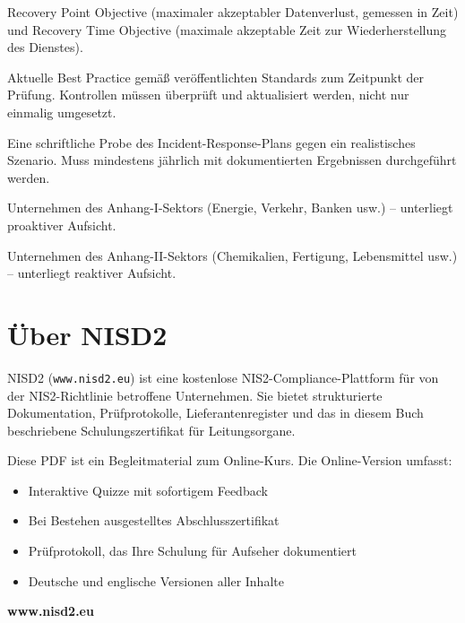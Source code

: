 \documentclass[11pt,a4paper,twoside]{book}
\begin{document}
\begin{description}[style=nextline, leftmargin=0pt, labelindent=0pt, parsep=5pt, itemsep=2pt]
  \item[RPO / RTO] Recovery Point Objective (maximaler akzeptabler Datenverlust, gemessen in Zeit) und Recovery Time Objective (maximale akzeptable Zeit zur Wiederherstellung des Dienstes).

  \item[Stand der Technik] Aktuelle Best Practice gemäß veröffentlichten Standards zum Zeitpunkt der Prüfung. Kontrollen müssen überprüft und aktualisiert werden, nicht nur einmalig umgesetzt.

  \item[Tischübung] Eine schriftliche Probe des Incident-Response-Plans gegen ein realistisches Szenario. Muss mindestens jährlich mit dokumentierten Ergebnissen durchgeführt werden.

  \item[Wesentliche Einrichtung] Unternehmen des Anhang-I-Sektors (Energie, Verkehr, Banken usw.) -- unterliegt proaktiver Aufsicht.

  \item[Wichtige Einrichtung] Unternehmen des Anhang-II-Sektors (Chemikalien, Fertigung, Lebensmittel usw.) -- unterliegt reaktiver Aufsicht.

\end{description}


\backmatter

\chapter*{Über NISD2}

NISD2 (\texttt{www.nisd2.eu}) ist eine kostenlose NIS2-Compliance-Plattform für von der NIS2-Richtlinie betroffene Unternehmen. Sie bietet strukturierte Dokumentation, Prüfprotokolle, Lieferantenregister und das in diesem Buch beschriebene Schulungszertifikat für Leitungsorgane.

Diese PDF ist ein Begleitmaterial zum Online-Kurs. Die Online-Version umfasst:
\begin{itemize}
  \item Interaktive Quizze mit sofortigem Feedback
  \item Bei Bestehen ausgestelltes Abschlusszertifikat
  \item Prüfprotokoll, das Ihre Schulung für Aufseher dokumentiert
  \item Deutsche und englische Versionen aller Inhalte
\end{itemize}

\textbf{www.nisd2.eu}

\vspace{1cm}
\begin{center}
\end{center}
\end{document}
